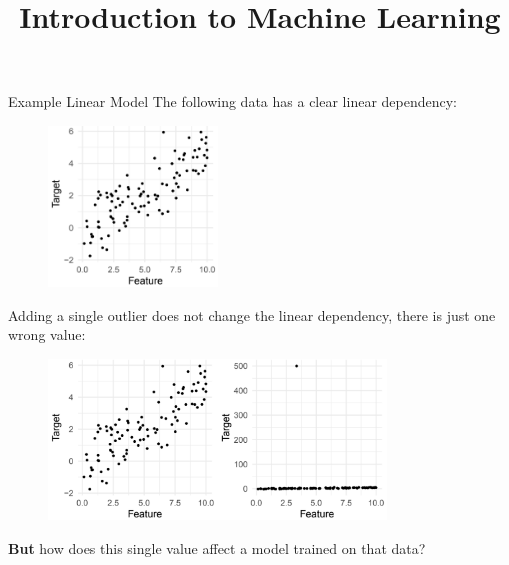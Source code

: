 



\newcommand{\titlefigure}{figure_man/automl2.png}
\newcommand{\learninggoals}{
  \item ...
  \item ...
}

\title{Introduction to Machine Learning}
\date{}





\begin{vbframe}{Example Linear Model}
    The following data has a clear linear dependency:
    \vspace{+.4cm}
    
    \begin{figure}
        \includegraphics[width = 0.4\textwidth]{figure_man/linear-model01.png}
    \end{figure}
    
    \framebreak
    
    Adding a single outlier does not change the linear dependency, there is just one wrong value:
    \vspace{+.4cm}
    
    \begin{figure}
        \includegraphics[width = 0.8\textwidth]{figure_man/linear-model02.png}
    \end{figure}
    
    \vspace{+.2cm}
    
    \textbf{But} how does this single value affect a model trained on that data?
\end{vbframe}

